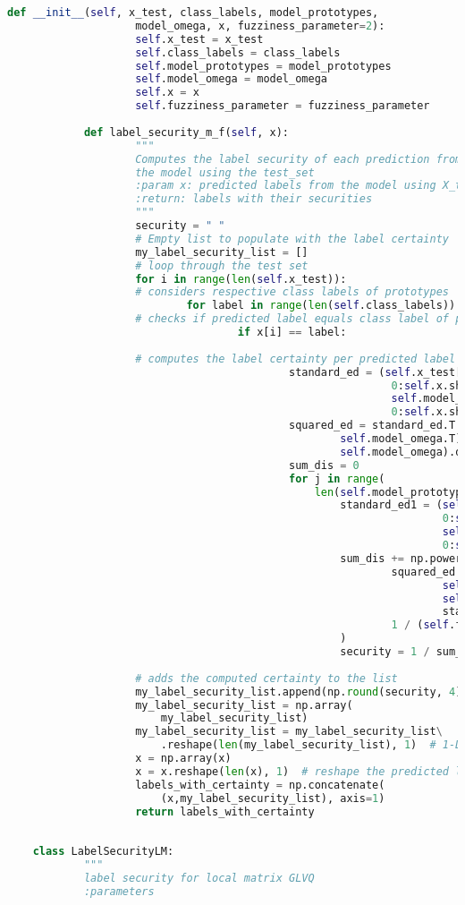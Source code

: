\documentclass[english]{HSMW-Thesis}
\begin{document}
\begin{lstlisting}[caption=label\textunderscore security1.py ,style=chstyle, language=Python]
			def __init__(self, x_test, class_labels, model_prototypes,
					model_omega, x, fuzziness_parameter=2):
					self.x_test = x_test
					self.class_labels = class_labels
					self.model_prototypes = model_prototypes
					self.model_omega = model_omega
					self.x = x
					self.fuzziness_parameter = fuzziness_parameter
	
			def label_security_m_f(self, x):
					"""
					Computes the label security of each prediction from 
					the model using the test_set
					:param x: predicted labels from the model using X_test
					:return: labels with their securities
					"""
					security = " "
					# Empty list to populate with the label certainty
					my_label_security_list = []
					# loop through the test set
					for i in range(len(self.x_test)):
					# considers respective class labels of prototypes
							for label in range(len(self.class_labels)):
					# checks if predicted label equals class label of prototypes
									if x[i] == label:
	
					# computes the label certainty per predicted label
											standard_ed = (self.x_test[i,
															0:self.x.shape[1]] - 
															self.model_prototypes[label,
															0:self.x.shape[1]])
											squared_ed = standard_ed.T.dot(
													self.model_omega.T).dot(
													self.model_omega).dot(standard_ed)
											sum_dis = 0
											for j in range(
												len(self.model_prototypes)):
													standard_ed1 = (self.x_test[i,
																	0:self.x.shape[1]] -
																	self.model_prototypes[j,
																	0:self.x.shape[1]])
													sum_dis += np.power(
															squared_ed / (standard_ed1.T.dot(
																	self.model_omega.T).dot(
																	self.model_omega).dot(
																	standard_ed1)),
															1 / (self.fuzziness_parameter - 1)
													)
													security = 1 / sum_dis
										
					# adds the computed certainty to the list
					my_label_security_list.append(np.round(security, 4))
					my_label_security_list = np.array(
						my_label_security_list)
					my_label_security_list = my_label_security_list\
						.reshape(len(my_label_security_list), 1)  # 1-D array reshape
					x = np.array(x)
					x = x.reshape(len(x), 1)  # reshape the predicted labels into 1-D array
					labels_with_certainty = np.concatenate(
						(x,my_label_security_list), axis=1)
					return labels_with_certainty
	
	
	class LabelSecurityLM:
			"""
			label security for local matrix GLVQ
			:parameters
	

\end{lstlisting}
\end{document}
